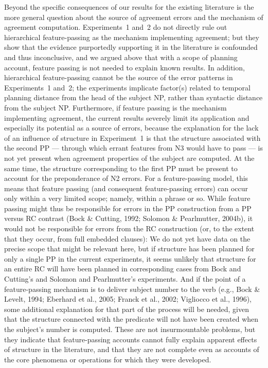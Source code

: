 \documentclass[12pt,titlepage]{article}
\begin{document}
Beyond the specific consequences of our results for the existing literature
is the more general question about the source of agreement errors and the
mechanism of agreement computation.  Experiments~1 and~2 do not directly
rule out hierarchical feature-passing as the mechanism implementing
agreement; but they show that the evidence purportedly supporting it in the
literature is confounded and thus inconclusive, and we argued above that
with a scope of planning account, feature passing is not needed to explain
known results.  In addition, hierarchical feature-passing cannot be the
source of the error patterns in Experiments~1 and~2; the experiments
implicate factor(s) related to temporal planning distance from the head of
the subject NP, rather than syntactic distance from the subject NP\@.
Furthermore, if feature passing is the mechanism implementing agreement,
the current results severely limit its application and especially its
potential as a source of errors, because the explanation for the lack of an
influence of structure in Experiment~1 is that the structure associated
with the second PP --- through which errant features from N3 would have to
pass --- is not yet present when agreement properties of the subject are
computed.  At the same time, the structure corresponding to the first PP
must be present to account for the preponderance of N2 errors.  For a
feature-passing model, this means that feature passing (and consequent
feature-passing errors) can occur only within a very limited scope; namely,
within a phrase or so.  While feature passing might thus be responsible for
errors in the PP construction from a PP versus RC contrast (Bock \&
Cutting, 1992; Solomon \& Pearlmutter, 2004b), it would not be responsible
for errors from the RC construction (or, to the extent that they occur,
from full embedded clauses): We do not yet have data on the precise scope
that might be relevant here, but if structure has been planned for only a
single PP in the current experiments, it seems unlikely that structure for
an entire RC will have been planned in corresponding cases from Bock and
Cutting's and Solomon and Pearlmutter's experiments.  And if the point of a
feature-passing mechanism is to deliver subject number to the verb (e.g.,
Bock \& Levelt, 1994; Eberhard et al., 2005; Franck et al., 2002; Vigliocco
et al., 1996), some additional explanation for that part of the process
will be needed, given that the structure connected with the predicate will
not have been created when the subject's number is computed.  These are not
insurmountable problems, but they indicate that feature-passing accounts
cannot fully explain apparent effects of structure in the literature, and
that they are not complete even as accounts of the core phenomena or
operations for which they were developed.
\end{document}
